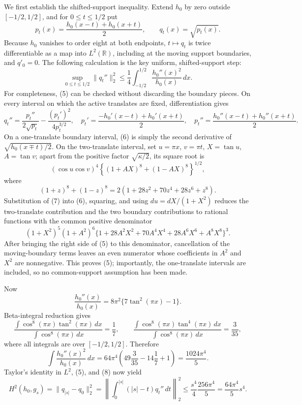We first establish the shifted-support inequality.  Extend \(h_0\) by zero outside \([-1/2,1/2]\), and for \(0\le t\le1/2\) put
\[
p_t(x)=\frac{h_0(x-t)+h_0(x+t)}2,
\qquad q_t(x)=\sqrt{p_t(x)}.
\]
Because \(h_0\) vanishes to order eight at both endpoints, \(t\mapsto q_t\) is twice differentiable as a map into \(L^2(\mathbb R)\), including at the moving support boundaries, and \(q'_0=0\).  The following calculation is the key uniform, shifted-support step:
\[
\sup_{0\le t\le1/2}\|q_t''\|_2^2
\le \frac14\int_{-1/2}^{1/2}\frac{h_0''(x)^2}{h_0(x)}\,dx. \tag{5}
\]
For completeness, (5) can be checked without discarding the boundary pieces.  On every interval on which the active translates are fixed, differentiation gives
\[
q_t''=\frac{p_t''}{2\sqrt{p_t}}-\frac{(p_t')^2}{4p_t^{3/2}},
\quad
p_t'=\frac{-h_0'(x-t)+h_0'(x+t)}2,
\quad
p_t''=\frac{h_0''(x-t)+h_0''(x+t)}2. \tag{6}
\]
On a one-translate boundary interval, (6) is simply the second derivative of \(\sqrt{h_0(x\mp t)/2}\).  On the two-translate interval, set \(u=\pi x\), \(v=\pi t\), \(X=\tan u\), \(A=\tan v\); apart from the positive factor \(\sqrt{\kappa/2}\), its square root is
\[
(\cos u\cos v)^4
\left\{(1+AX)^8+(1-AX)^8\right\}^{1/2},
\]
where
\[
(1+z)^8+(1-z)^8=2(1+28z^2+70z^4+28z^6+z^8). \tag{7}
\]
Substitution of (7) into (6), squaring, and using \(du=dX/(1+X^2)\) reduces the two-translate contribution and the two boundary contributions to rational functions with the common positive denominator
\[
(1+X^2)^5(1+A^2)^6
\{1+28A^2X^2+70A^4X^4+28A^6X^6+A^8X^8\}^3.
\]
After bringing the right side of (5) to this denominator, cancellation of the moving-boundary terms leaves an even numerator whose coefficients in \(A^2\) and \(X^2\) are nonnegative.  This proves (5); importantly, the one-translate intervals are included, so no common-support assumption has been made.

Now
\[
\frac{h_0''(x)}{h_0(x)}=8\pi^2\{7\tan^2(\pi x)-1\}.
\]
Beta-integral reduction gives
\[
\frac{\int\cos^8(\pi x)\tan^2(\pi x)\,dx}{\int\cos^8(\pi x)\,dx}=\frac17,
\qquad
\frac{\int\cos^8(\pi x)\tan^4(\pi x)\,dx}{\int\cos^8(\pi x)\,dx}=\frac3{35},
\]
where all integrals are over \([-1/2,1/2]\).  Therefore
\[
\int\frac{h_0''(x)^2}{h_0(x)}\,dx
=64\pi^4\left(49\frac3{35}-14\frac17+1\right)
=\frac{1024\pi^4}{5}. \tag{8}
\]
Taylor's identity in \(L^2\), (5), and (8) now yield
\[
H^2(h_0,g_s)=\|q_{|s|}-q_0\|_2^2
=\left\|\int_0^{|s|}(|s|-t)q_t''\,dt\right\|_2^2
\le \frac{s^4}{4}\frac{256\pi^4}{5}
=\frac{64\pi^4}{5}s^4. \tag{9}
\]

